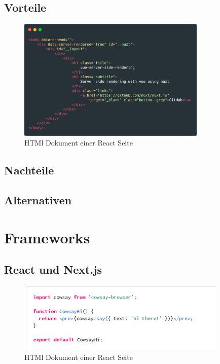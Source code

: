 \documentclass[runningheads]{llncs}
\begin{document}
\newpage
\subsection{Vorteile}
\label{subsec:Vorteile}

\begin{figure}[h]
  \centering
  \includegraphics[width=9cm]{images/nuxt-body-first}
  \caption{HTMl Dokument einer React Seite}
\end{figure}

\subsection{Nachteile}
\label{subsec:Nachteile}

\subsection{Alternativen}
\label{subsec:Alternativen}

\newpage

\section{Frameworks}
\label{sec:Evaluation}

\subsection{React und Next.js}
\label{subsec:React und Next.js}

\begin{figure}
  \centering
  \includegraphics[width=10cm]{images/CodeSplitting}
  \caption{HTMl Dokument einer React Seite}
\end{figure}
\end{document}
